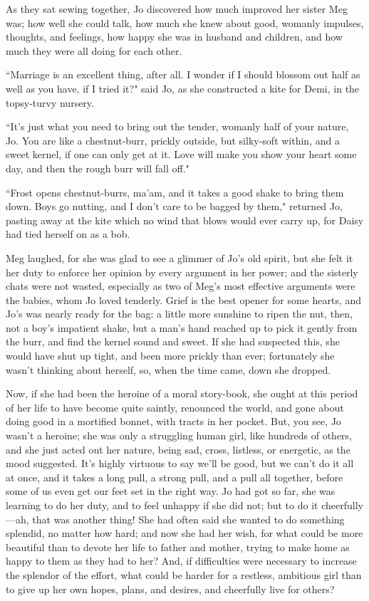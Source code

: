 As they sat sewing together, Jo discovered how much improved her sister
Meg was; how well she could talk, how much she knew about good, womanly
impulses, thoughts, and feelings, how happy she was in husband and
children, and how much they were all doing for each other.

``Marriage is an excellent thing, after all. I wonder if I should blossom
out half as well as you have, if I tried it?" said Jo, as she
constructed a kite for Demi, in the topsy-turvy nursery.

``It's just what you need to bring out the tender,
womanly half of your nature, Jo. You are like a chestnut-burr, prickly
outside, but silky-soft within, and a sweet kernel, if one can only get
at it. Love will make you show your heart some day, and then the rough
burr will fall off."

``Frost opens chestnut-burrs, ma'am, and it takes a good
shake to bring them down. Boys go nutting, and I don't
care to be bagged by them," returned Jo, pasting away at the kite which
no wind that blows would ever carry up, for Daisy had tied herself on as
a bob.

Meg laughed, for she was glad to see a glimmer of Jo's
old spirit, but she felt it her duty to enforce her opinion by every
argument in her power; and the sisterly chats were not wasted,
especially as two of Meg's most effective arguments were
the babies, whom Jo loved tenderly. Grief is the best opener for some
hearts, and Jo's was nearly ready for the bag: a little
more sunshine to ripen the nut, then, not a boy's
impatient shake, but a man's hand reached up to pick it
gently from the burr, and find the kernel sound and sweet. If she had
suspected this, she would have shut up tight, and been more prickly than
ever; fortunately she wasn't thinking about herself, so,
when the time came, down she dropped.

Now, if she had been the heroine of a moral story-book, she ought at
this period of her life to have become quite saintly, renounced the
world, and gone about doing good in a mortified bonnet, with tracts in
her pocket. But, you see, Jo wasn't a heroine; she was
only a struggling human girl, like hundreds of others, and she just
acted out her nature, being sad, cross, listless, or energetic, as the
mood suggested. It's highly virtuous to say
we'll be good, but we can't do it all at
once, and it takes a long pull, a strong pull, and a pull all together,
before some of us even get our feet set in the right way. Jo had got so
far, she was learning to do her duty, and to feel unhappy if she did
not; but to do it cheerfully---ah, that was another thing! She had often
said she wanted to do something splendid, no matter how hard; and now
she had her wish, for what could be more beautiful than to devote her
life to father and mother, trying to make home as happy to them as they
had to her? And, if difficulties were necessary to increase the splendor
of the effort, what could be harder for a restless, ambitious girl than
to give up her own hopes, plans, and desires, and cheerfully live for
others?

